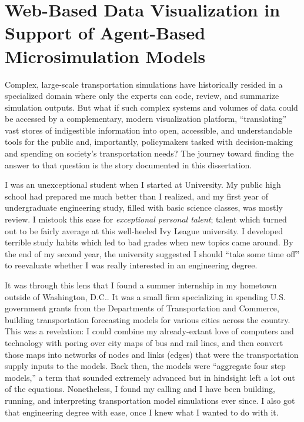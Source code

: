 \hypertarget{introduction-main}{%
\section{Web-Based Data Visualization in Support of Agent-Based Microsimulation Models}
\label{introduction-main}}

Complex, large-scale transportation simulations have historically resided in a specialized domain where only the experts can code, review, and summarize simulation outputs.  But what if such complex systems and volumes of data could be accessed by a complementary, modern visualization platform, ``translating'' vast stores of indigestible information into open, accessible, and understandable tools for the public and, importantly, policymakers tasked with decision-making and spending on society's transportation needs?  The journey toward finding the answer to that question is the story documented in this dissertation.

I was an unexceptional student when I started at University. My public high school had prepared me much better than I realized, and my first year of undergraduate engineering study, filled with basic science classes, was mostly review. I mistook this ease for \emph{exceptional personal talent}; talent which turned out to be fairly average at this well-heeled Ivy League university. I developed terrible study habits which led to bad grades when new topics came around. By the end of my second year, the university suggested I should ``take some time off'' to reevaluate whether I was really interested in an engineering degree.

It was through this lens that I found a summer internship in my hometown outside of Washington, D.C.. It was a small firm specializing in spending U.S. government grants from the Departments of Transportation and Commerce, building transportation forecasting models for various cities across the country. This was a revelation: I could combine my already-extant love of computers and technology with poring over city maps of bus and rail lines, and then convert those maps into networks of nodes and links (edges) that were the transportation supply inputs to the models. Back then, the models were ``aggregate four step models,'' a term that sounded extremely advanced but in hindsight left a lot out of the equations. Nonetheless, I found my calling and I have been building, running, and interpreting transportation model simulations ever since. I also got that engineering degree with ease, once I knew what I wanted to do with it.

